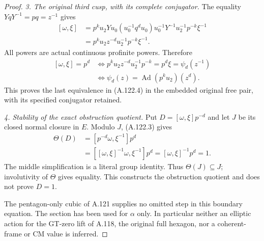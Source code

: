 \begin{proof}
\emph{3. The original third cusp, with its complete conjugator.}
The equality \(YqY^{-1}=pq=z^{-1}\) gives
\[
 \begin{aligned}
 [\omega,\xi]
 &=p^ku_2Y u_0(u_0^{-1}q^du_0)u_0^{-1}Y^{-1}
                         u_2^{-1}p^{-k}\xi^{-1}\\
 &=p^ku_2z^{-d}u_2^{-1}p^{-k}\xi^{-1}.
 \end{aligned}                                               \tag{A.122.8}
\]
All powers are actual continuous profinite powers. Therefore
\[
 \begin{aligned}
 [\omega,\xi]=p^d
 &\Longleftrightarrow
 p^ku_2z^{-d}u_2^{-1}p^{-k}=p^d\xi=\psi_d(z^{-1})\\
 &\Longleftrightarrow
 \psi_d(z)=\operatorname{Ad}(p^ku_2)(z^d).
 \end{aligned}
\]
This proves the last equivalence in (A.122.4) in the embedded
original free pair, with its specified conjugator retained.

\emph{4. Stability of the exact obstruction quotient.}
Put \(D=[\omega,\xi]p^{-d}\) and let \(J\) be its closed normal
closure in \(E\). Modulo \(J\), (A.122.3) gives
\[
 \begin{aligned}
 \Theta(D)
 &=[p^{-d}\omega,\xi^{-1}]p^d\\
 &=[[\omega,\xi]^{-1}\omega,\xi^{-1}]p^d
   =[\omega,\xi]^{-1}p^d=1 .
 \end{aligned}
\]
The middle simplification is a literal group identity. Thus
\(\Theta(J)\subseteq J\); involutivity of \(\Theta\) gives
equality. This constructs the obstruction quotient and does
not prove \(D=1\).

The pentagon-only cubic of A.121 supplies no omitted step in this
boundary equation. The section has been used for \(\alpha\)
only. In particular neither an elliptic action for the GT-zero
lift of A.118, the original full hexagon, nor a coherent-frame
or CM value is inferred.
\end{proof}
